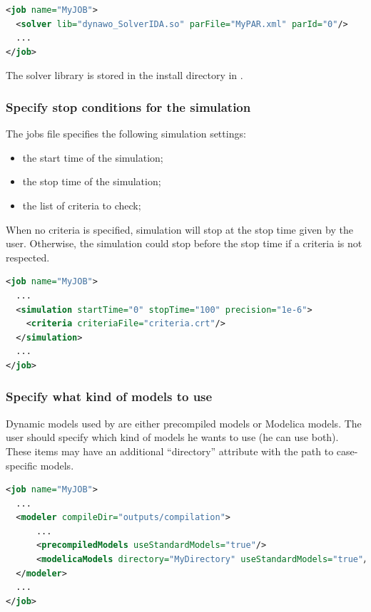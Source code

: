 \documentclass[a4paper, 12pt]{report}
\begin{document}
\begin{lstlisting}[language=XML, morekeywords={lib}]
<job name="MyJOB">
  <solver lib="dynawo_SolverIDA.so" parFile="MyPAR.xml" parId="0"/>
  ...
</job>
\end{lstlisting}

The solver library is stored in the install directory in .

\subsubsection{Specify stop conditions for the simulation}

The jobs file specifies the following simulation settings:
\begin{itemize}
\item the start time of the simulation;
\item the stop time of the simulation;
\item the list of criteria to check;
\end{itemize}

When no criteria is specified, simulation will stop at the stop time given by
the user. Otherwise, the simulation could stop before the stop
time if a criteria is not respected.

\begin{lstlisting}[language=XML, morekeywords={activateCriteria}]
<job name="MyJOB">
  ...
  <simulation startTime="0" stopTime="100" precision="1e-6">
    <criteria criteriaFile="criteria.crt"/>
  </simulation>
  ...
</job>
\end{lstlisting}

\subsubsection{Specify what kind of models to use}

Dynamic models used by \Dynawo are either precompiled models or Modelica models. The user should specify which kind of models he wants to use (he can use both). These items may have an additional ``directory'' attribute with the path to case-specific models.

\begin{lstlisting}[language=XML, morekeywords={precompiledModels, modelicaModels}]
<job name="MyJOB">
  ...
  <modeler compileDir="outputs/compilation">
      ...
      <precompiledModels useStandardModels="true"/>
      <modelicaModels directory="MyDirectory" useStandardModels="true"/>
  </modeler>
  ...
</job>
\end{lstlisting}
\end{document}
